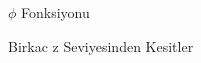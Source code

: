 \documentclass[12pt,fleqn]{article}
\begin{document}
\begin{figure}[!hbp]
\caption{$\phi$ Fonksiyonu}
\end{figure}

\begin{figure}[!hbp]
\caption{Birkac z Seviyesinden Kesitler}
\end{figure}
\end{document}
